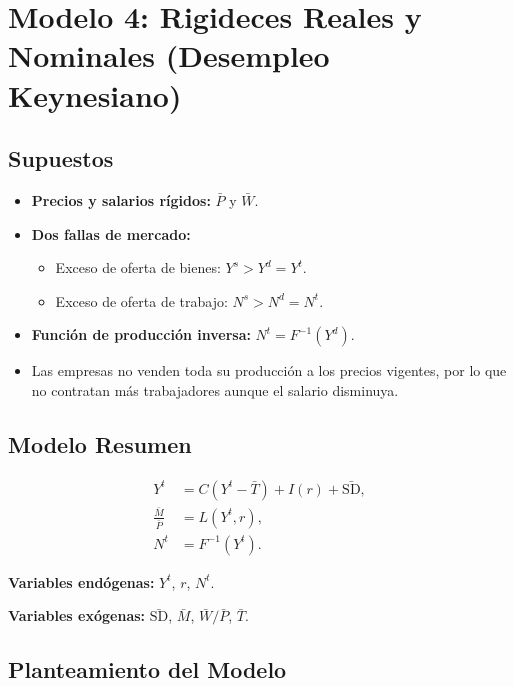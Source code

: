 \documentclass[
  doc,
  floatsintext,
  longtable,
  a4paper,
  nolmodern,
  notxfonts,
  notimes,
  12pt,
  colorlinks=true,linkcolor=blue,citecolor=blue,urlcolor=blue]{apa7}
\providecommand{\tightlist}{%
  \setlength{\itemsep}{0pt}\setlength{\parskip}{0pt}}
\begin{document}
\section{Modelo 4: Rigideces Reales y Nominales (Desempleo
Keynesiano)}\label{modelo-4-rigideces-reales-y-nominales-desempleo-keynesiano}

\subsection{Supuestos}\label{supuestos-3}

\begin{itemize}
\tightlist
\item
  \textbf{Precios y salarios rígidos:} \(\bar{P}\) y \(\bar{W}\).
\item
  \textbf{Dos fallas de mercado:}

  \begin{itemize}
  \tightlist
  \item
    Exceso de oferta de bienes: \(Y^s > Y^d = Y^t\).
  \item
    Exceso de oferta de trabajo: \(N^s > N^d = N^t\).
  \end{itemize}
\item
  \textbf{Función de producción inversa:} \(N^t = F^{-1}(Y^d)\).
\item
  Las empresas no venden toda su producción a los precios vigentes, por
  lo que no contratan más trabajadores aunque el salario disminuya.
\end{itemize}

\subsection{Modelo Resumen}\label{modelo-resumen}

\[
\begin{aligned}
Y^t &= C(Y^t - \bar{T}) + I(r) + \bar{\mathrm{SD}}, \\
\frac{\bar{M}}{\bar{P}} &= L(Y^t, r), \\
N^t &= F^{-1}(Y^t).
\end{aligned}
\]

\textbf{Variables endógenas:} \(Y^t\), \(r\), \(N^t\).

\textbf{Variables exógenas:} \(\bar{\mathrm{SD}}\), \(\bar{M}\),
\(\bar{W}/\bar{P}\), \(\bar{T}\).

\subsection{Planteamiento del Modelo}\label{planteamiento-del-modelo-1}
\end{document}
